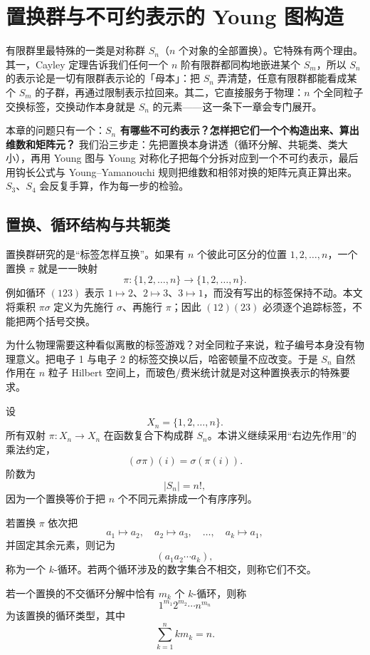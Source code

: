 \chapter{置换群与不可约表示的 Young 图构造}
\label{chap:permutation-group}

有限群里最特殊的一类是对称群 $S_n$（$n$ 个对象的全部置换）。它特殊有两个理由。其一，Cayley 定理告诉我们任何一个 $n$ 阶有限群都同构地嵌进某个 $S_m$，所以 $S_n$ 的表示论是一切有限群表示论的「母本」：把 $S_n$ 弄清楚，任意有限群都能看成某个 $S_m$ 的子群，再通过限制表示拉回来。其二，它直接服务于物理：$n$ 个全同粒子交换标签，交换动作本身就是 $S_n$ 的元素——这一条下一章会专门展开。

本章的问题只有一个：\textbf{$S_n$ 有哪些不可约表示？怎样把它们一个个构造出来、算出维数和矩阵元？} 我们沿三步走：先把置换本身讲透（循环分解、共轭类、类大小），再用 Young 图与 Young 对称化子把每个分拆对应到一个不可约表示，最后用钩长公式与 Young--Yamanouchi 规则把维数和相邻对换的矩阵元真正算出来。$S_3$、$S_4$ 会反复手算，作为每一步的检验。

\section{置换、循环结构与共轭类}
\label{sec:sn-cycle-conjugacy}

置换群研究的是“标签怎样互换”。如果有 $n$ 个彼此可区分的位置 $1,2,\dots,n$，一个置换 $\pi$ 就是一一映射
\[
\pi:\{1,2,\dots,n\}\to\{1,2,\dots,n\}.
\]
例如循环 $(123)$ 表示 $1\mapsto2$、$2\mapsto3$、$3\mapsto1$，而没有写出的标签保持不动。本文将乘积 $\pi\sigma$ 定义为先施行 $\sigma$、再施行 $\pi$；因此 $(12)(23)$ 必须逐个追踪标签，不能把两个括号交换。

为什么物理需要这种看似离散的标签游戏？对全同粒子来说，粒子编号本身没有物理意义。把电子 1 与电子 2 的标签交换以后，哈密顿量不应改变。于是 $S_n$ 自然作用在 $n$ 粒子 Hilbert 空间上，而玻色/费米统计就是对这种置换表示的特殊要求。

设
\[
X_n=\{1,2,\dots,n\}.
\]
所有双射 $\pi:X_n\to X_n$ 在函数复合下构成群 $S_n$。本讲义继续采用“右边先作用”的乘法约定，
\[
(\sigma\pi)(i)=\sigma(\pi(i)).
\]
阶数为
\[
|S_n|=n!,
\]
因为一个置换等价于把 $n$ 个不同元素排成一个有序序列。

\begin{definition}[循环与循环类型]
若置换 $\pi$ 依次把
\[
a_1\mapsto a_2,\quad a_2\mapsto a_3,\quad\dots,\quad a_k\mapsto a_1,
\]
并固定其余元素，则记为
\[
(a_1a_2\cdots a_k),
\]
称为一个 $k$-循环。若两个循环涉及的数字集合不相交，则称它们不交。

若一个置换的不交循环分解中恰有 $m_k$ 个 $k$-循环，则称
\[
1^{m_1}2^{m_2}\cdots n^{m_n}
\]
为该置换的循环类型，其中
\begin{equation}
\sum_{k=1}^n k m_k=n.
\label{eq:partition-cycle-type}
\end{equation}
\label{def:cycle-type}
\end{definition}


